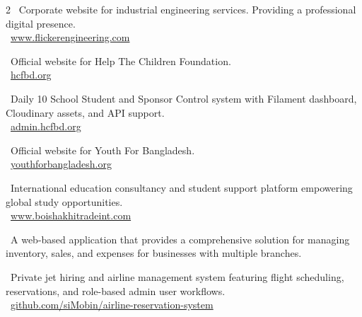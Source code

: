 
\begin{paracol}{2}
    \small \faChevronRight \ Corporate website for industrial engineering services. Providing a professional digital presence. \\[0.5em]
    \small \faGlobe \ \href{https://www.flickerengineering.com}{www.flickerengineering.com}

    \divider

    \small \faChevronRight \ Official website for Help The Children Foundation. \\[0.5em]
    \small \faGlobe \ \href{https://hcfbd.org}{hcfbd.org}

    \divider

    \small \faChevronRight \ Daily 10 School Student and Sponsor Control system with Filament dashboard, Cloudinary assets, and API support. \\[0.5em]
    \small \faGlobe \ \href{https://admin.hcfbd.org}{admin.hcfbd.org}

    \divider

    \small \faChevronRight \ Official website for Youth For Bangladesh. \\[0.5em]
    \small \faGlobe \ \href{https://youthforbangladesh.org}{youthforbangladesh.org}

    \divider

    \small \faChevronRight \ International education consultancy and student support platform empowering global study opportunities. \\[0.5em]
    \small \faGlobe \ \href{https://www.boishakhitradeint.com}{www.boishakhitradeint.com}

    \divider

    \small \faChevronRight \ A web-based application that provides a comprehensive solution for managing inventory, sales, and expenses for businesses with multiple branches.

    \divider

    \small \faChevronRight \ Private jet hiring and airline management system featuring flight scheduling, reservations, and role-based admin user workflows. \\[0.5em]
    \small \faGithub \ \href{https://github.com/siMobin/airline-reservation-system}{github.com/siMobin/airline-reservation-system}


\end{paracol}

